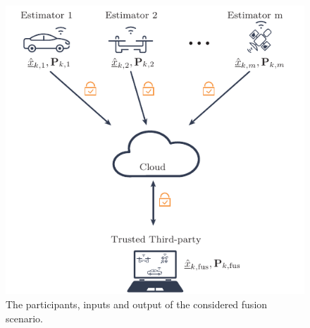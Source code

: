 \documentclass[letterpaper, 10 pt, conference]{ieeeconf}
\begin{document}
\begin{figure}[t]
    \centering
    \includegraphics[width=\columnwidth]{figures/illustration.pdf}%
    \caption{The participants, inputs and output of the considered fusion scenario.}\vspace{-\baselineskip}%
    \label{fig:layout}%
\end{figure}%
\end{document}
